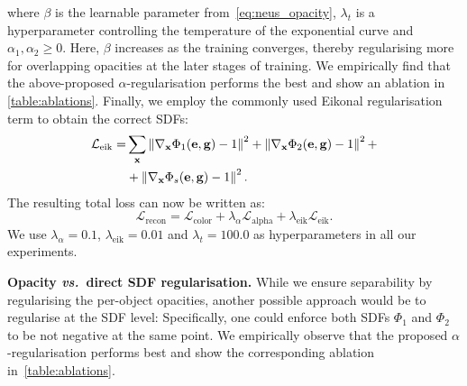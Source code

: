 where $\beta$ is the learnable parameter from~\cref{eq:neus_opacity}, $\lambda_t$ is a hyperparameter controlling the temperature of the exponential curve and $\alpha_1, \alpha_2 \geq 0$. 
Here, $\beta$ increases as the training converges, thereby regularising more for overlapping opacities at the later stages of training. 
We empirically find that the above-proposed $\alpha$-regularisation performs the best and show an ablation in \cref{table:ablations}. 
Finally, we employ the commonly used Eikonal regularisation term 
to obtain the correct SDFs: 
\begin{align} \label{eq:eikonal_reg}
    \mathcal{L}_{\text{eik}} = &\sum_\mathbf{x} \left\lVert \nabla_\mathbf{x} \Phi_1(\mathbf{e}, \mathbf{g}) - 1 \right\rVert^2 + \left\lVert\nabla_\mathbf{x} \Phi_2(\mathbf{e}, \mathbf{g}) - 1\right\rVert^2 + \nonumber \\ 
     & + \left\lVert\nabla_\mathbf{x} \Phi_s(\mathbf{e}, \mathbf{g}) - 1\right\rVert^2. 
\end{align}
The resulting total loss can now be written as:
\begin{equation} \label{eq:total_loss}
    \mathcal{L}_{\text{recon}} = \mathcal{L}_{\text{color}} + \lambda_\alpha \mathcal{L}_{\text{alpha}} + \lambda_{\text{eik}} \mathcal{L}_{\text{eik}}. 
\end{equation}
We use $\lambda_{\alpha} = 0.1$, $\lambda_{\text{eik}} = 0.01$ and $\lambda_t = 100.0$ as hyperparameters in all our experiments. 
\par

\noindent \textbf{Opacity \textit{vs.}~direct SDF regularisation.} 
While we 
ensure separability by regularising the per-object opacities, another possible approach would be to 
regularise at the SDF level: 
Specifically, one could enforce both SDFs $\Phi_1$ and $\Phi_2$ to be not negative at the same point. 
We empirically observe that the proposed $\alpha$-regularisation performs best and show the corresponding ablation in~\cref{table:ablations}. 

